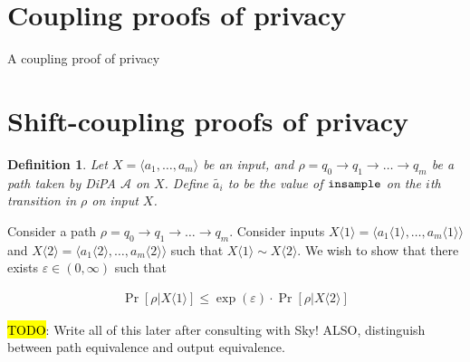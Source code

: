 \documentclass{article}
\newtheorem{definition}{Definition}[section]
\renewcommand{\epsilon}{\varepsilon}
\newcommand{\insample}{\textup{\texttt{insample}}}
\newcommand{\1}{\langle 1 \rangle}
\newcommand{\2}{\langle 2 \rangle}
\begin{document}
\section{Coupling proofs of privacy}

A coupling proof of privacy 

\section{Shift-coupling proofs of privacy}

\begin{definition}
    Let  $X = \langle a_1, \dots, a_m \rangle$ be an input, and $\rho = q_0 \to q_1 \to \dots \to q_m$ be a path taken by DiPA $\mathcal{A}$ on $X$. Define $\tilde{a_i}$ to be the value of $\insample$ on the $i$th transition in $\rho$ on input $X$.
\end{definition}

Consider a path $\rho = q_0 \to q_1 \to \dots \to q_m$. Consider inputs $X \langle 1 \rangle = \langle a_1 \langle 1 \rangle, \dots, a_m \langle 1 \rangle \rangle$ and $X \langle 2 \rangle = \langle a_1 \langle 2 \rangle, \dots, a_m \langle 2 \rangle \rangle$ such that $X \langle 1 \rangle \sim X \langle 2 \rangle$. We wish to show that there exists $\epsilon \in (0, \infty)$ such that

\begin{align*}
    \Pr\left[\rho | X \langle 1 \rangle \right] \leq \exp(\epsilon) \cdot \Pr\left[\rho | X \langle 2 \rangle\right]
\end{align*}

\hl{TODO}: Write all of this later after consulting with Sky! ALSO, distinguish between path equivalence and output equivalence.
\end{document}
